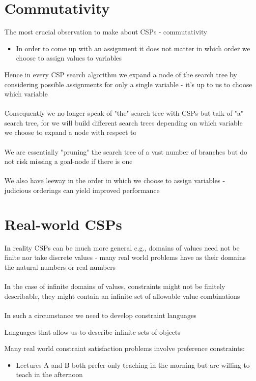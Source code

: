 \documentclass{article}[18pt]
\begin{document}
\section{Commutativity}
The most crucial observation to make about CSPs - commutativity
\begin{itemize}
	\item In order to come up with an assignment it does not matter in which order we choose to assign values to variables
\end{itemize}
Hence in every CSP search algorithm we expand a node of the search tree by considering possible assignments for only a single variable - it's up to us to choose which variable\\
\\
Consequently we no longer speak of "the" search tree with CSPs but talk of "a" search tree, for we will build different search trees depending on which variable we choose to expand a node with respect to\\
\\
We are essentially "pruning" the search tree of a vast number of branches but do not risk missing a goal-node if there is one\\
\\
We also have leeway in the order in which we choose to assign variables - judicious orderings can yield improved performance
\section{Real-world CSPs}
In reality CSPs can be much more general e.g., domains of values need not be finite nor take discrete values - many real world problems have as their domains the natural numbers or real numbers\\
\\
In the case of infinite domains of values, constraints might not be finitely describable, they might contain an infinite set of allowable value combinations\\
\\
In such a circumstance we need to develop constraint languages
\begin{defin}
Languages that allow us to describe infinite sets of objects
\end{defin}
Many real world constraint satisfaction problems involve preference constraints:
\begin{itemize}
	\item Lectures A and B both prefer only teaching in the morning but are willing to teach in the afternoon
\end{itemize}
\end{document}
